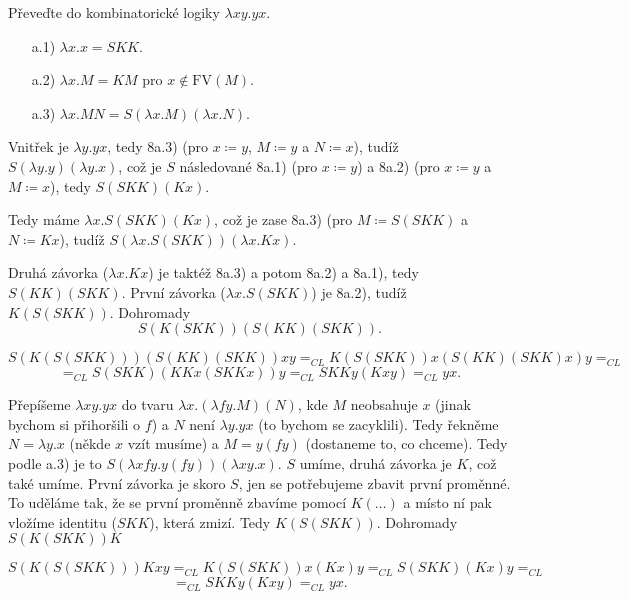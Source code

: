 \documentclass[12pt]{article}					%
\begin{document}
	\begin{priklad}[8 $\implies$ 9c]
		Převeďte do kombinatorické logiky $λxy.yx$.

		\begin{poznamkain}[8]
			\begin{itemize}
				\item[a.1)] $λx.x = SKK$.
				\item[a.2)] $λx.M = KM$ pro $x \notin \text{FV}(M)$.
				\item[a.3)] $λx.MN = S(λx.M)(λx.N)$.
			\end{itemize}
		\end{poznamkain}

		\begin{reseni}
			Vnitřek je $λy.yx$, tedy 8a.3) (pro $x \coloneq y$, $M \coloneq y$ a $N \coloneq x$), tudíž $S(λy.y)(λy.x)$, což je $S$ následované 8a.1) (pro $x \coloneq y$) a 8a.2) (pro $x \coloneq y$ a $M \coloneq x$), tedy $S(SKK)(Kx)$.

			Tedy máme $λx.S(SKK)(Kx)$, což je zase 8a.3) (pro $M \coloneq S(SKK)$ a $N \coloneq Kx$), tudíž $S(λx.S(SKK))(λx.Kx)$.

			Druhá závorka ($λx.Kx$) je taktéž 8a.3) a potom 8a.2) a 8a.1), tedy $S(KK)(SKK)$. První závorka ($λx.S(SKK)$) je 8a.2), tudíž $K(S(SKK))$. Dohromady
			$$ S(K(SKK))(S(KK)(SKK)). $$
		\end{reseni}

		\begin{dukazin}[Zkouška]
			$$ S(K(S(SKK)))(S(KK)(SKK))xy =_{CL} K(S(SKK))x(S(KK)(SKK)x)y =_{CL} $$
			$$ =_{CL} S(SKK)(KKx(SKKx))y =_{CL} SKKy(Kxy) =_{CL} yx. $$
		\end{dukazin}

		\begin{reseni}
			Přepíšeme $λxy.yx$ do tvaru $λx.(λfy.M)(N)$, kde $M$ neobsahuje $x$ (jinak bychom si přihoršili o $f$) a $N$ není $λy.yx$ (to bychom se zacyklili). Tedy řekněme $N=λy.x$ (někde $x$ vzít musíme) a $M=y(fy)$ (dostaneme to, co chceme). Tedy podle a.3) je to $S(λxfy.y(fy))(λxy.x)$. $S$ umíme, druhá závorka je $K$, což také umíme. První závorka je skoro $S$, jen se potřebujeme zbavit první proměnné. To uděláme tak, že se první proměnně zbavíme pomocí $K(…)$ a místo ní pak vložíme identitu ($SKK$), která zmizí. Tedy $K(S(SKK))$. Dohromady $S(K(SKK))K$
		\end{reseni}

		\begin{dukazin}[Zkouška]
			$$ S(K(S(SKK)))Kxy =_{CL} K(S(SKK))x(Kx)y =_{CL} S(SKK)(Kx)y =_{CL} $$
			$$ =_{CL} SKKy(Kxy) =_{CL} yx. $$
		\end{dukazin}
	\end{priklad}
\end{document}
